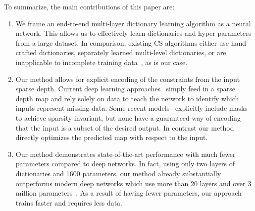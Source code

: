 To summarize, the main contributions of this paper are:
\begin{enumerate}
\item We frame an end-to-end multi-layer dictionary learning algorithm as a neural network. This allows us to effectively learn dictionaries and hyper-parameters from a large dataset. In comparison, existing CS algorithms either use hand crafted dictionaries, separately learned multi-level dictionaries, or are inapplicable to incomplete training data~\cite{}, as is our case.

  
\item Our method allows for explicit encoding of the constraints from the input sparse depth. Current deep learning approaches~\cite{} simply feed in a sparse depth map and rely solely on data to teach the network to identify which inputs represent missing data. Some recent models~\cite{} explicitly include masks to achieve sparsity invariant, but none have a guaranteed way of encoding that the input is a subset of the desired output. In contrast our method directly optimizes the predicted map with respect to the input.
  
  
\item Our method demonstrates state-of-the-art performance with much fewer parameters compared to deep networks. In fact, using only two layers of dictionaries and 1600 parameters, our method already substantially outperforms modern deep networks which use more than 20 layers and over 3 million parameters~\cite{}. As a result of having fewer parameters, our approach trains faster and requires less data.
  
\end{enumerate}
  